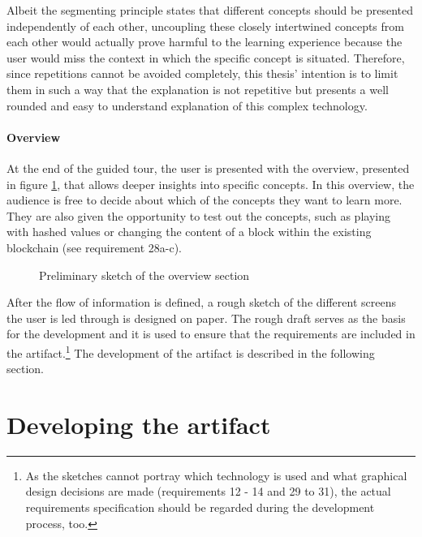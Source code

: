 Albeit the segmenting principle states that different concepts should be presented independently of each other, uncoupling these closely intertwined concepts from each other would actually prove harmful to the learning experience because the user would miss the context in which the specific concept is situated. Therefore, since repetitions cannot be avoided completely, this thesis' intention is to limit them in such a way that the explanation is not repetitive but presents a well rounded and easy to understand explanation of this complex technology.

\paragraph{Overview} At the end of the guided tour, the user is presented with the overview, presented in figure \ref{fig:OverviewPic}, that allows deeper insights into specific concepts.
In this overview, the audience is free to decide about which of the concepts they want to learn more. They are also given the opportunity to test out the concepts, such as playing with hashed values or changing the content of a block within the existing blockchain (see requirement 28a-c).

\begin{figure}
    \centering
    
    \caption{Preliminary sketch of the overview section}
    \label{fig:OverviewPic}
\end{figure}

After the flow of information is defined, a rough sketch of the different screens the user is led through is designed on paper. The rough draft serves as the basis for the development and it is used to ensure that the requirements are included in the artifact.\footnote{As the sketches cannot portray which technology is used and what graphical design decisions are made (requirements 12 - 14 and 29 to 31), the actual requirements specification should be regarded during the development process, too.} The development of the artifact is described in the following section.

\section{Developing the artifact}

